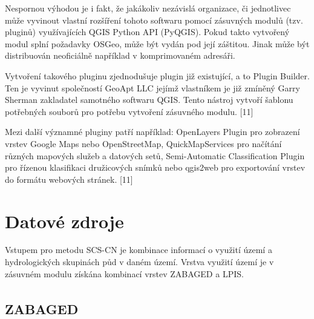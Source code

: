 \documentclass[a4paper,oneside,12pt]{book}
\begin{document}
\hspace{10mm} Nespornou výhodou je i fakt, že jakákoliv nezávislá organizace, či jednotlivec může vyvinout vlastní rozšíření tohoto softwaru pomocí zásuvných modulů (tzv. pluginů) využívajících QGIS Python API (PyQGIS). Pokud takto vytvořený modul splní požadavky OSGeo, může být vydán pod její záštitou. Jinak může být distribuován neoficiálně například v komprimovaném adresáři.

\hspace{10mm} Vytvoření takového pluginu zjednodušuje plugin již existující, a to Plugin Builder. Ten je vyvinut společností GeoApt LLC jejímž vlastníkem je již zmíněný Garry Sherman zakladatel samotného softwaru QGIS. Tento nástroj vytvoří šablonu potřebných souborů pro potřebu vytvoření zásuvného modulu. [11]

\hspace{10mm} Mezi další významné pluginy patří například: OpenLayers Plugin pro zobrazení vrstev Google Maps nebo OpenStreetMap, QuickMapServices pro načítání různých mapových služeb a datových setů, Semi-Automatic Classification Plugin pro řízenou klasifikaci družicových snímků nebo qgis2web pro exportování vrstev do formátu webových stránek. [11]



\chapter{Datové zdroje} \label{data}
\hspace{10mm} Vstupem pro metodu SCS-CN je kombinace informací o využití území a hydrologických skupinách půd v daném území. Vrstva využití území je v zásuvném modulu získána kombinací vrstev ZABAGED a LPIS. 

\section{ZABAGED\texorpdfstring{\textsuperscript{\textregistered}}{ (R)}} \label{zabaged}
\end{document}
